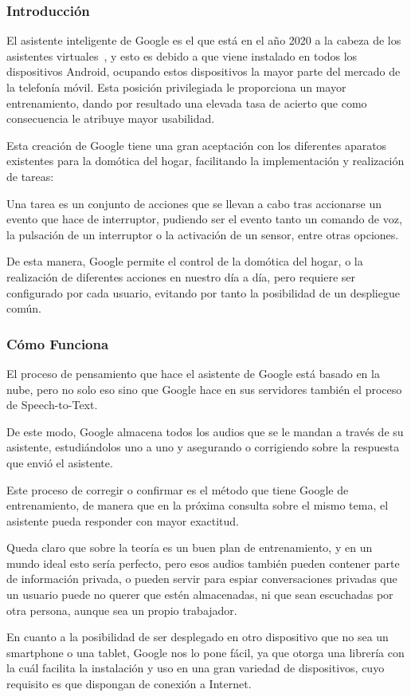 \subsubsection{Introducción}

El asistente inteligente de Google es el que está en el año 2020 a la cabeza de los asistentes virtuales~\cite{top-asistentes}, y esto es debido a que viene instalado en todos los dispositivos Android, ocupando estos dispositivos la mayor parte del mercado de la telefonía móvil. Esta posición privilegiada le proporciona un mayor entrenamiento, dando por resultado una elevada tasa de acierto que como consecuencia le atribuye mayor usabilidad.

Esta creación de Google tiene una gran aceptación con los diferentes aparatos existentes para la domótica del hogar, facilitando la implementación y realización de tareas:

Una tarea es un conjunto de acciones que se llevan a cabo tras accionarse un evento que hace de interruptor, pudiendo ser el evento tanto un comando de voz, la pulsación de un interruptor o la activación de un sensor, entre otras opciones.

De esta manera, Google permite el control de la domótica del hogar, o la realización de diferentes acciones en nuestro día a día, pero requiere ser configurado por cada usuario, evitando por tanto la posibilidad de un despliegue común.

\subsubsection{Cómo Funciona}

El proceso de pensamiento que hace el asistente de Google está basado en la nube, pero no solo eso sino que Google hace en sus servidores también el proceso de Speech-to-Text.

De este modo, Google almacena todos los audios\cite{google-almacena} que se le mandan a través de su asistente, estudiándolos uno a uno y asegurando o corrigiendo sobre la respuesta que envió el asistente.

Este proceso de corregir o confirmar es el método que tiene Google de entrenamiento, de manera que en la próxima consulta sobre el mismo tema, el asistente pueda responder con mayor exactitud.

Queda claro que sobre la teoría es un buen plan de entrenamiento, y en un mundo ideal esto sería perfecto, pero esos audios también pueden contener parte de información privada, o pueden servir para espiar conversaciones privadas que un usuario puede no querer que estén almacenadas, ni que sean escuchadas por otra persona, aunque sea un propio trabajador.

En cuanto a la posibilidad de ser desplegado en otro dispositivo que no sea un smartphone o una tablet, Google nos lo pone fácil, ya que otorga una librería con la cuál facilita la instalación y uso en una gran variedad de dispositivos, cuyo requisito es que dispongan de conexión a Internet.

